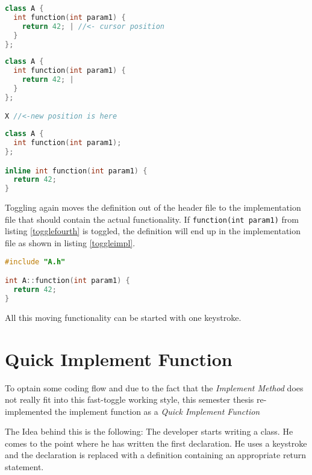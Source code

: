 \begin{lstlisting}[caption={Startposition of toggling},
label={togglefirst}, language=C++]
class A {
  int function(int param1) {
    return 42; | //<- cursor position
  }
};
\end{lstlisting}

\begin{lstlisting}[caption={New position is found},
label={togglethird}, language=C++]
class A {
  int function(int param1) {
    return 42; |
  }
};

X //<-new position is here
\end{lstlisting}

\begin{lstlisting}[caption={Class with declaration and inlined definition},
label={togglefourth}, language=C++]
class A {
  int function(int param1);
};

inline int function(int param1) {
  return 42;
}
\end{lstlisting}

Toggling again moves the definition out of the header file to the 
implementation file that should contain the actual functionality. If
\texttt{function(int param1)} from listing \ref{togglefourth} is toggled,
the definition will end up in the implementation file as shown in listing
\ref{toggleimpl}.

\begin{lstlisting}[caption={defintion in a implementation file},
label={toggleimpl}, language=C++]
#include "A.h"

int A::function(int param1) {
  return 42;
}
\end{lstlisting}

All this moving functionality can be started with one keystroke.

\section*{Quick Implement Function}

To optain some coding flow and due to the fact that the \textit{Implement
Method} does not really fit into this fast-toggle working style, this semester
thesis re-implemented the implement function as a \textit{Quick Implement
Function}

The Idea behind this is the following: The developer starts writing a class.
He comes to the point where he has written the first declaration. He uses a
keystroke and the declaration is replaced with a definition containing an
appropriate return statement.

